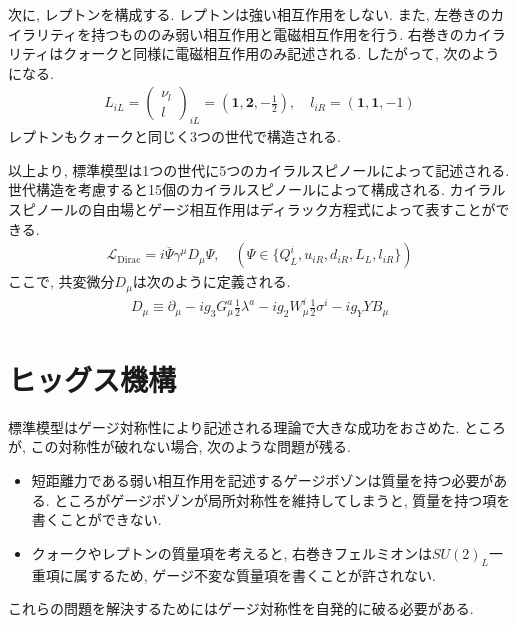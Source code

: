 次に, レプトンを構成する.
レプトンは強い相互作用をしない.
また, 左巻きのカイラリティを持つもののみ弱い相互作用と電磁相互作用を行う.
右巻きのカイラリティはクォークと同様に電磁相互作用のみ記述される.
したがって, 次のようになる.
\begin{align}
  L_{iL} = \begin{pmatrix}
    \nu_l \\
    l
  \end{pmatrix}_{iL} = \left(\bm{1}, \bm{2}, -\frac{1}{2}\right),\quad
  l_{iR} = \left(\bm{1}, \bm{1}, -1\right)
\end{align}
レプトンもクォークと同じく3つの世代で構造される.

以上より, 標準模型は1つの世代に5つのカイラルスピノールによって記述される.
世代構造を考慮すると15個のカイラルスピノールによって構成される.
カイラルスピノールの自由場とゲージ相互作用はディラック方程式によって表すことができる.
\begin{align}
  \mathcal{L}_{\mathrm{Dirac}} = i\overline{\Psi}\gamma^\mu D_\mu \Psi,\quad \left(\Psi\in\{Q^i_L, u_{iR}, d_{iR}, L_L, l_{iR} \}\right)
\end{align}
ここで, 共変微分$D_\mu$は次のように定義される.
\begin{align}
  D_\mu \equiv \partial_\mu -ig_3 G_\mu^a \frac{1}{2}\lambda^a -ig_2 W_\mu^i\frac{1}{2}\sigma^i -ig_Y Y B_\mu
\end{align}


\section{ヒッグス機構}
標準模型はゲージ対称性により記述される理論で大きな成功をおさめた.
ところが, この対称性が破れない場合, 次のような問題が残る.
\begin{itemize}
  \item 短距離力である弱い相互作用を記述するゲージボゾンは質量を持つ必要がある. ところがゲージボゾンが局所対称性を維持してしまうと, 質量を持つ項を書くことができない.
  \item クォークやレプトンの質量項を考えると, 右巻きフェルミオンは$SU(2)_L$一重項に属するため, ゲージ不変な質量項を書くことが許されない.
\end{itemize}
これらの問題を解決するためにはゲージ対称性を自発的に破る必要がある.

